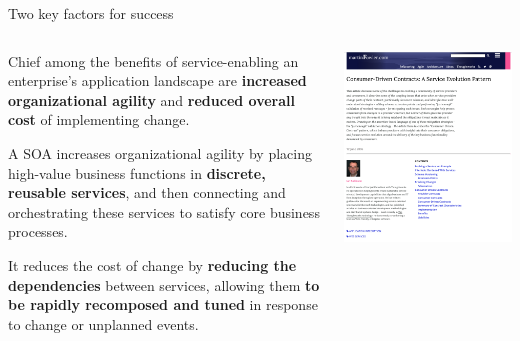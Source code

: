 \begin{frame}{Two key factors for success}
\begin{columns}
    \begin{column}{0.6\textwidth}
        \begin{shadequote}
            \small{
            \hspace{.5cm} Chief among the benefits of service-enabling an enterprise's
            application landscape are \textbf{increased organizational agility} and
            \textbf{reduced overall cost} of implementing change.

            \vspace{.3cm}

            A SOA increases organizational agility by placing high-value business functions
            in \textbf{discrete, reusable services}, and then connecting and orchestrating
            these services to satisfy core business processes.

            \vspace{.5cm}
            It reduces the cost of change by \textbf{reducing the dependencies} between services,
            allowing them \textbf{to be rapidly recomposed and tuned} in response to change or
            unplanned events.
            }
        \end{shadequote}
    \end{column}
    \begin{column}{0.4\textwidth}
        \includegraphics[width=1\textwidth]{./assets/ian_robinson}
    \end{column}
\end{columns}
\end{frame}

